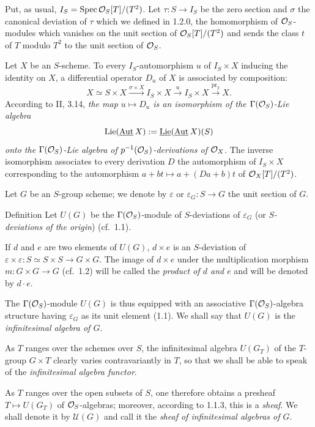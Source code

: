 Put, as usual, $I_S=\operatorname{Spec}\mathcal{O}_S[T]/(T^2)$. Let $\tau:S\to I_S$ be the zero section and $\sigma$ the canonical deviation of $\tau$ which we defined in 1.2.0, \ie the homomorphism of $\mathcal{O}_S$-modules which vanishes on the unit section of $\mathcal{O}_S[T]/(T^2)$ and sends the class $t$ of $T$ modulo $T^2$ to the unit section of $\mathcal{O}_S$.

Let $X$ be an $S$-scheme. To every $I_S$-automorphism $u$ of $I_S\times X$ inducing the identity on $X$, a differential operator $D_u$ of $X$ is associated by composition:
\[
X\simeq S\times X\xrightarrow{\sigma\times X}I_S\times X\xrightarrow{u}I_S\times X\xrightarrow{\mathrm{pr}_2}X.
\]
According to II, 3.14, \emph{the map $u\mapsto D_u$ is an isomorphism of the $\Gamma(\mathcal{O}_S)$-Lie algebra}
\[
\operatorname{Lie}(\underline{\operatorname{Aut}}\,X):=\underline{\operatorname{Lie}}(\underline{\operatorname{Aut}}\,X)(S)
\]
\emph{onto the $\Gamma(\mathcal{O}_S)$-Lie algebra of $p^{-1}(\mathcal{O}_S)$-derivations of $\mathcal{O}_X$}. The inverse isomorphism associates to every derivation $D$ the automorphism of $I_S\times X$ corresponding to the automorphism $a+bt\mapsto a+(Da+b)t$ of $\mathcal{O}_X[T]/(T^2)$.

Let $G$ be an $S$-group scheme; we denote by $\varepsilon$ or $\varepsilon_G:S\to G$ the unit section of $G$.

\begin{enoncerm}{Definition}{}
Let $U(G)$ be the $\Gamma(\mathcal{O}_S)$-module of $S$-deviations of $\varepsilon_G$ (or \emph{$S$-deviations of the origin}) (cf.\ 1.1).

If $d$ and $e$ are two elements of $U(G)$, $d\times e$ is an $S$-deviation of $\varepsilon\times\varepsilon:S\simeq S\times S\to G\times G$. The image of $d\times e$ under the multiplication morphism $m:G\times G\to G$ (cf.\ 1.2) will be called the \emph{product of $d$ and $e$} and will be denoted by $d\cdot e$.

The $\Gamma(\mathcal{O}_S)$-module $U(G)$ is thus equipped with an associative $\Gamma(\mathcal{O}_S)$-algebra structure having $\varepsilon_G$ as its unit element (1.1). We shall say that $U(G)$ is the \emph{infinitesimal algebra of $G$}.

As $T$ ranges over the schemes over $S$, the infinitesimal algebra $U(G_T)$ of the $T$-group $G\times T$ clearly varies contravariantly in $T$, so that we shall be able to speak of the \emph{infinitesimal algebra functor}.

As $T$ ranges over the open subsets of $S$, one therefore obtains a presheaf $T\mapsto U(G_T)$ of $\mathcal{O}_S$-algebras; moreover, according to 1.1.3, this is a \emph{sheaf}. We shall denote it by $\mathscr U(G)$ and call it the \emph{sheaf of infinitesimal algebras of $G$}.
\end{enoncerm}

